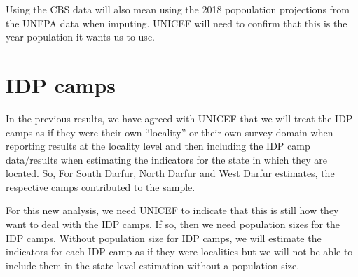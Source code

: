 \documentclass[12pt,a4paper]{article}
\begin{document}
Using the CBS data will also mean using the 2018 popoulation projections from the UNFPA data when imputing. UNICEF will need to confirm that this is the year population it wants us to use.

\hypertarget{idp-camps}{%
\section{IDP camps}\label{idp-camps}}

In the previous results, we have agreed with UNICEF that we will treat the IDP camps as if they were their own ``locality'' or their own survey domain when reporting results at the locality level and then including the IDP camp data/results when estimating the indicators for the state in which they are located. So, For South Darfur, North Darfur and West Darfur estimates, the respective camps contributed to the sample.

For this new analysis, we need UNICEF to indicate that this is still how they want to deal with the IDP camps. If so, then we need population sizes for the IDP camps. Without population size for IDP camps, we will estimate the indicators for each IDP camp as if they were localities but we will not be able to include them in the state level estimation without a population size.
\end{document}
